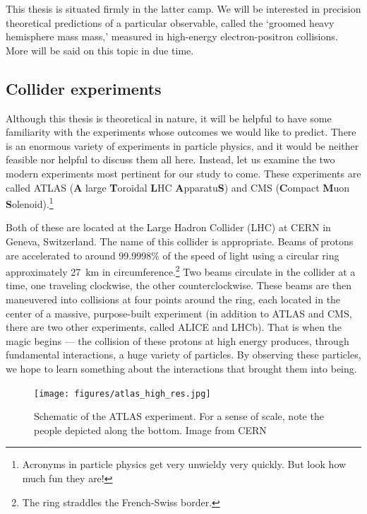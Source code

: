 \documentclass[../thesis.tex]{subfiles}
\begin{document}
	This thesis is situated firmly in the latter camp. We will be interested in precision theoretical predictions of a particular observable, called the `groomed heavy hemisphere mass mass,' measured in high-energy electron-positron collisions. More will be said on this topic in due time.


\subsection{Collider experiments}
	Although this thesis is theoretical in nature, it will be helpful to have some familiarity with the experiments whose outcomes we would like to predict. There is an enormous variety of experiments in particle physics, and it would be neither feasible nor helpful to discuss them all here. Instead, let us examine the two modern experiments most pertinent for our study to come. These experiments are called ATLAS (\textbf{A} large \textbf{T}oroidal \textbf{L}HC \textbf{A}pparatu\textbf{S}) and CMS (\textbf{C}ompact \textbf{M}uon \textbf{S}olenoid).\footnote{Acronyms in particle physics get very unwieldy very quickly. But look how much fun they are!} 

	Both of these are located at the Large Hadron Collider (LHC) at CERN in Geneva, Switzerland. The name of this collider is appropriate. Beams of protons are accelerated to around 99.9998\% of the speed of light using a circular ring approximately \SI{27}{\kilo\metre} in circumference.\footnote{The ring straddles the French-Swiss border.} Two beams circulate in the collider at a time, one traveling clockwise, the other counterclockwise. These beams are then maneuvered into collisions at four points around the ring, each located in the center of a massive, purpose-built experiment (in addition to ATLAS and CMS, there are two other experiments, called ALICE and LHCb). That is when the magic begins --- the collision of these protons at high energy produces, through fundamental interactions, a huge variety of particles. By observing these particles, we hope to learn something about the interactions that brought them into being.

	\begin{figure}
	\begin{center}
		\texttt{[image: figures/atlas\_high\_res.jpg]}
		\caption{\label{intro-fig:atlas diagram}Schematic of the ATLAS experiment. For a sense of scale, note the people depicted along the bottom. Image from CERN \cite{cern_ac_layout_1998}}
	\end{center}
	\end{figure}
\end{document}
